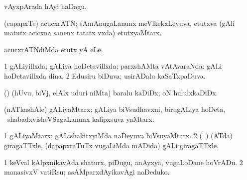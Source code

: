 {{{{{{\bentry
{}
  \gl{\nA}\bmng
vAyxpArada hAyi haDagu. 
\emng
\eentry

\bentry
{} 
\gl{\nA}
\expl{}
\bmng
(capapxTe) acucxrATN; sAmAnugaLanunx meVlkekxLeyuva, etutxva (gAli matutx acicxna sanenx tatatx vxda) etutxyaMtarx. 
\emng
\eentry

\bentry
{}
\gl{\sakirx}
\bmng
acucxrATNdiMda etutx yA eLe. 
\emng
\eentry

\bentry
{} 
\gl{\gu}
\expl{}
\bmng
\bnum
\num{1} gALiyillxda; gALiya hoDetavillxda; parxshAMta vAtAvaraNda:  gALi hoDetavillxda dina. 
\num{2} Edusiru biDuva; usirADalu kaSaTxpaDuva. 
\enum
\emng
\eentry

\bentry
{}
  \gl{\nA}\bmng
(\pArxparx) (hUvu, biVj, elAlx uduri niMta) baralu kaDiDx; oN hululxkaDiDx. 
\emng
\eentry

\bentry
{}
 \gl{\nA}\bmng
(nATkashAle) gALiyaMtarx; gALiya biVsudhavxni, birugALiya hoDeta, \mo\ shabadxvisheVSagaLanunx kalipxsuva yaMtarx. 
\emng
\eentry

\bentry
{} 
\gl{\nA}
\expl{}
\bmng
\bnum
\num{1} gALiyaMtarx; gALishakitxyiMda naDeyuva biVsuyaMtarx. 
\num{2} (\kanmu\ \birx) (ATda) giragaTTxle, (dapapxraTuTx \mo vugaLiMda mADida) gALi giragaTTxle. 
\enum
\emng

\noindent 
\gl{\pagu}
\expl{}
\bmng
\bnum
\num{1}  keVval kAlpxnikavAda shaturx, piDugu, anAyxya, \mo vugaLoDane hoVrADu. 
\num{2}  manasivxV vatiRsu; asAMparxdAyikavAgi naDeduko. 
\enum
\emng
\eentry

}}}}}}
